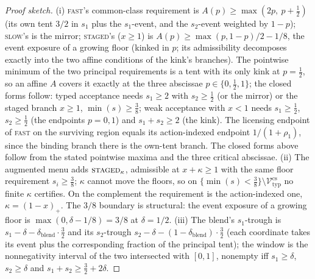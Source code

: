 \documentclass[preprint,11pt,authoryear]{elsarticle}
\theoremstyle{remark}
\newcommand{\Vtyp}{\mathcal{V}_{\mathrm{typ}}}
\newcommand{\act}[1]{\textsc{#1}}
\begin{document}
\begin{proof}[Proof sketch]
(i) \act{fast}'s common-class requirement is $A(p)\ge\max(2p,\ p+\tfrac12)$ (its own tent $3/2$ in $s_1$ plus the $s_1$-event, and the $s_2$-event weighted by $1-p$); \act{slow}'s is the mirror; \act{staged}'s ($x\ge1$) is $A(p)\ge\max(p,1-p)/2-1/8$, the event exposure of a growing floor (kinked in $p$; its admissibility decomposes exactly into the two affine conditions of the kink's branches). The pointwise minimum of the two principal requirements is a tent with its only kink at $p=\tfrac12$, so an affine $A$ covers it exactly at the three abscissae $p\in\{0,\tfrac12,1\}$; the closed forms follow: typed acceptance needs $s_1\ge2$ with $s_2\ge\tfrac12$ (or the mirror) or the staged branch $x\ge1$, $\min(s)\ge\tfrac38$; weak acceptance with $x<1$ needs $s_1\ge\tfrac12$, $s_2\ge\tfrac12$ (the endpoints $p=0,1$) and $s_1+s_2\ge2$ (the kink). The licensing endpoint of \act{fast} on the surviving region equals its action-indexed endpoint $1/(1+\rho_1)$, since the binding branch there is the own-tent branch. The closed forms above follow from the stated pointwise maxima and the three critical abscissae.
(ii) The augmented menu adds $\act{staged}_\kappa$, admissible at $x+\kappa\ge1$ with the same floor requirement $s_i\ge\tfrac38$; $\kappa$ cannot move the floors, so on $\{\min(s)<\tfrac38\}\setminus\Vtyp^{\mathrm{cs}}$ no finite $\kappa$ certifies. On the complement the requirement is the action-indexed one, $\kappa=(1-x)_+$. The $3/8$ boundary is structural: the event exposure of a growing floor is $\max(0,\delta-1/8)=3/8$ at $\delta=1/2$.
(iii) The blend's $s_1$-trough is $s_1-\delta-\delta_{\mathrm{blend}}\cdot\tfrac32$ and its $s_2$-trough $s_2-\delta-(1-\delta_{\mathrm{blend}})\cdot\tfrac32$ (each coordinate takes its event plus the corresponding fraction of the principal tent); the window is the nonnegativity interval of the two intersected with $[0,1]$, nonempty iff $s_1\ge\delta$, $s_2\ge\delta$ and $s_1+s_2\ge\tfrac32+2\delta$.
\end{proof}
\end{document}
